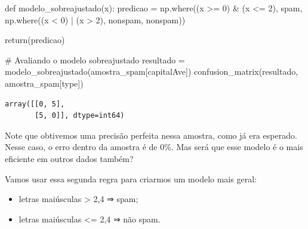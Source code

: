 \documentclass[
  letterpaper,
  DIV=11,
  numbers=noendperiod]{scrreprt}
\newenvironment{Shaded}{\begin{snugshade}}{\end{snugshade}}
\newcommand{\CommentTok}[1]{\textcolor[rgb]{0.37,0.37,0.37}{#1}}
\newcommand{\ControlFlowTok}[1]{\textcolor[rgb]{0.00,0.23,0.31}{#1}}
\newcommand{\DecValTok}[1]{\textcolor[rgb]{0.68,0.00,0.00}{#1}}
\newcommand{\KeywordTok}[1]{\textcolor[rgb]{0.00,0.23,0.31}{#1}}
\newcommand{\NormalTok}[1]{\textcolor[rgb]{0.00,0.23,0.31}{#1}}
\newcommand{\OperatorTok}[1]{\textcolor[rgb]{0.37,0.37,0.37}{#1}}
\newcommand{\StringTok}[1]{\textcolor[rgb]{0.13,0.47,0.30}{#1}}
\begin{document}
\begin{Shaded}
\begin{Highlighting}[]
\KeywordTok{def}\NormalTok{ modelo\_sobreajustado(x):}
\NormalTok{    predicao }\OperatorTok{=}\NormalTok{ np.where((x }\OperatorTok{\textgreater{}=} \DecValTok{0}\NormalTok{) }\OperatorTok{\&}\NormalTok{ (x }\OperatorTok{\textless{}=} \DecValTok{2}\NormalTok{), }\StringTok{\textquotesingle{}spam\textquotesingle{}}\NormalTok{,}
\NormalTok{                        np.where((x }\OperatorTok{\textless{}} \DecValTok{0}\NormalTok{) }\OperatorTok{|}\NormalTok{ (x }\OperatorTok{\textgreater{}} \DecValTok{2}\NormalTok{), }\StringTok{\textquotesingle{}nonspam\textquotesingle{}}\NormalTok{, }\StringTok{\textquotesingle{}nonspam\textquotesingle{}}\NormalTok{))}

    \ControlFlowTok{return}\NormalTok{(predicao)}

\CommentTok{\# Avaliando o modelo sobreajustado}
\NormalTok{resultado }\OperatorTok{=}\NormalTok{ modelo\_sobreajustado(amostra\_spam[}\StringTok{\textquotesingle{}capitalAve\textquotesingle{}}\NormalTok{])}
\NormalTok{confusion\_matrix(resultado, amostra\_spam[}\StringTok{\textquotesingle{}type\textquotesingle{}}\NormalTok{])}
\end{Highlighting}
\end{Shaded}

\begin{verbatim}
array([[0, 5],
       [5, 0]], dtype=int64)
\end{verbatim}

Note que obtivemos uma precisão perfeita nessa amostra, como já era
esperado. Nesse caso, o erro dentro da amostra é de 0\%. Mas será que
esse modelo é o mais eficiente em outros dados também?

Vamos usar essa segunda regra para criarmos um modelo mais geral:

\begin{itemize}
\item
  letras maiúsculas \textgreater{} 2,4 ⇒ spam;
\item
  letras maiúsculas \textless= 2,4 ⇒ não spam.
\end{itemize}
\end{document}
